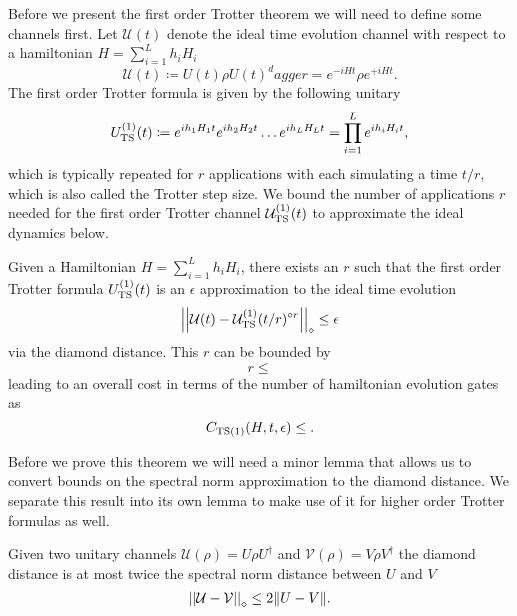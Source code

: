 Before we present the first order Trotter theorem we will need to define some channels first. Let $\mathcal{U}(t)$ denote the ideal time evolution channel with respect to a hamiltonian $H = \sum_{i = 1}^L h_i H_i$
\begin{equation}
    \mathcal{U}(t) \coloneqq U(t) \rho U(t)^dagger = e^{-i H t} \rho e^{+i H t}.
\end{equation}
The first order Trotter formula is given by the following unitary
\begin{equation}
    U_{\rm TS}^{(1)}(t) \coloneqq e^{i h_1 H_1 t}e^{i h_2 H_2 t} \ldots e^{i h_L H_L t} = \prod_{i = 1}^L e^{i h_i H_i t},
\end{equation}
which is typically repeated for $r$ applications with each simulating a time $t / r$, which is also called the Trotter step size. We bound the number of applications $r$ needed for the first order Trotter channel $\mathcal{U}_{\rm TS}^{(1)}(t)$ to approximate the ideal dynamics below.
\begin{theorem}
    Given a Hamiltonian $H = \sum_{i = 1}^L h_i H_i$, there exists an $r$ such that the first order Trotter formula $U_{\rm TS}^{(1)}(t)$ is an $\epsilon$ approximation to the ideal time evolution
    \begin{equation}
        \left| \left| \mathcal{U}(t) - \mathcal{U}_{\rm TS}^{(1)}(t/r)^{\circ r} \right| \right|_\diamond \le \epsilon
    \end{equation}
    via the diamond distance. This $r$ can be bounded by 
    \begin{equation}
        r \le
    \end{equation}
    leading to an overall cost in terms of the number of hamiltonian evolution gates as 
    \begin{equation}
        C_{\rm TS(1)}(H, t, \epsilon) \le .
    \end{equation}
\end{theorem}
Before we prove this theorem we will need a minor lemma that allows us to convert bounds on the spectral norm approximation to the diamond distance. We separate this result into its own lemma to make use of it for higher order Trotter formulas as well.
\begin{lemma}
    Given two unitary channels $\mathcal{U}(\rho) = U \rho U^\dagger$ and $\mathcal{V}(\rho) = V \rho V^\dagger$ the diamond distance is at most twice the spectral norm distance between $U$ and $V$
    \begin{equation}
        \left| \left| \mathcal{U} - \mathcal{V} \right| \right|_\diamond \le 2 \norm{U - V}.
    \end{equation}
\end{lemma}
